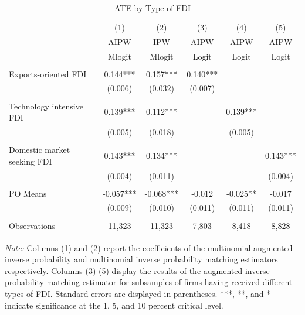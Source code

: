 \documentclass[a4paper,11pt]{scrartcl}
\begin{document}
\begin{table}[htbp]
	\centering
	\caption{ATE by Type of FDI}
	\label{tab:bytype}
\begin{threeparttable}

\begin{tabular}{lccccc} 
		\hline
		\hline
 	& (1) & (2) & (3) & (4) & (5) \\
	& AIPW & IPW  & AIPW  & AIPW & AIPW \\ 
	& Mlogit & Mlogit &Logit &Logit &Logit\\
		\hline
 			&  &  &  &  &   \\
Exports-oriented FDI 	& 0.144*** &   0.157*** & 0.140*** &  &  \\
 						& (0.006) &   (0.032) & (0.007) &  &\\ \\[-1.8ex]
Technology intensive FDI & 0.139***   & 0.112*** &  & 0.139*** &   \\
 						 & (0.005)  & (0.018) &  &  (0.005)&  \\ \\[-1.8ex]
Domestic market seeking FDI & 0.143*** &   0.134*** &  &  &0.143*** \\
 							& (0.004)   & (0.011) &  &  & (0.004)  \\ \\[-1.8ex]
PO Means 		&   -0.057*** &   -0.068*** &-0.012  &-0.025**  & -0.017    \\
 				&   (0.009) &   (0.010) &  (0.011)&(0.011)  & (0.011) \\ \\[-0.2em]
Observations 	& 11,323  & 11,323 &  7,803  & 8,418 & 8,828  \\ 
		\hline
		\hline
\end{tabular}

\begin{tablenotes} [flushleft]
\footnotesize
\item \textit{Note:} Columns (1) and (2) report the coefficients of the multinomial augmented inverse probability and multinomial inverse probability matching estimators respectively. Columns (3)-(5) display the results of the augmented inverse probability matching estimator for subsamples of firms having received different types of FDI. Standard errors are displayed in parentheses. ***, **, and * indicate significance at the 1, 5, and 10 percent critical level. 
\end{tablenotes}

\end{threeparttable}
\end{table}
\end{document}
